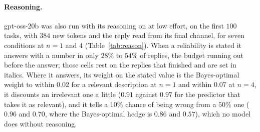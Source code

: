 \documentclass{article}
\begin{document}
\begin{table}[!htb]
\centering\footnotesize
\caption{\textbf{The wording of the description sets how much a model relies on it, but under no wording does the weight follow the stated specificity.} Weight on the stated value for the three relevant descriptions at $n = 1$ and $4$ under four wordings (written readout, $2{,}000$ tasks). Number: the share of replies with a number; italics: below three quarters in that cell. The Bayes-optimal weight is $0.50$, $0.80$, and $0.97$ at $n = 1$ and $0.20$, $0.50$, and $0.90$ at $n = 4$.}
\label{tab:paraphrase}
\vspace{3pt}

\end{table}

\paragraph{Reasoning.} gpt-oss-20b was also run with its reasoning on at low effort, on the first $100$ tasks, with $384$ new tokens and the reply read from its final channel, for seven conditions at $n = 1$ and $4$ (Table~\ref{tab:reason}). When a reliability is stated it answers with a number in only $28\%$ to $54\%$ of replies, the budget running out before the answer; those cells rest on the replies that finished and are set in italics. Where it answers, its weight on the stated value is the Bayes-optimal weight to within $0.02$ for a relevant description at $n = 1$ and within $0.07$ at $n = 4$, it discounts an irrelevant one a little ($0.91$ against $0.97$ for the predictor that takes it as relevant), and it tells a $10\%$ chance of being wrong from a $50\%$ one ($0.96$ and $0.70$, where the Bayes-optimal hedge is $0.86$ and $0.57$), which no model does without reasoning.

\begin{table}[!htb]
\centering\small
\caption{\textbf{With reasoning, gpt-oss-20b puts the Bayes-optimal weight on the stated value.} Low reasoning effort, $100$ tasks, $\sigma = 60$. Number: the fraction of replies that are a number. Weight and error: the model's against the Bayes-optimal predictor's, which hedges with the stated $p$ where one is given. Italics: fewer than three quarters of the replies are a number.}
\label{tab:reason}
\vspace{3pt}

\end{table}
\end{document}
